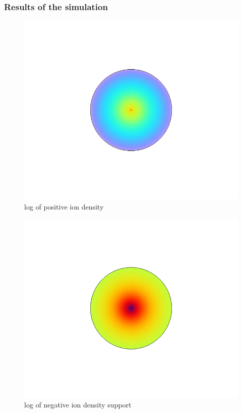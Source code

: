\subsubsection*{Results of the simulation}
\begin{figure}[p]
	\centering
	\includegraphics[scale=0.3]{images/results images/Comsol images/log of positive ion density.png}
	\caption{log of positive ion density}
\end{figure}
\begin{figure}[p]
	\centering
	\includegraphics[scale=0.4]{images/results images/Comsol images/log of negative ion density.png}
	\caption{log of negative ion density
	support}
\end{figure}
